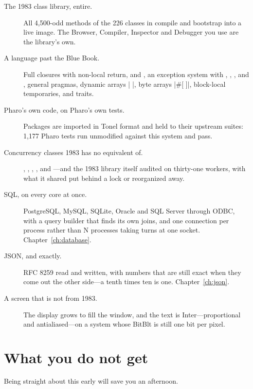 \begin{description}
\item[The 1983 class library, entire.] All 4{,}500-odd methods of the 226
  classes in  compile and bootstrap into a live image. The
  Browser, Compiler, Inspector and Debugger you use are the library's own.
\item[A language past the Blue Book.] Full closures with non-local return,
   and , an exception system with ,
  , ,  and , general pragmas,
  dynamic arrays \ct|{ }|, byte arrays \ct|#[ ]|, block-local temporaries, and
  traits.
\item[Pharo's own code, on Pharo's own tests.] Packages are imported in Tonel
  format and held to their upstream suites: 1{,}177 Pharo tests run unmodified
  against this system and pass.
\item[Concurrency classes 1983 has no equivalent of.] ,
  , , , and
  ---and the 1983 library itself audited on
  thirty-one workers, with what it shared put behind a lock or reorganized
  away.
\item[SQL, on every core at once.] PostgreSQL, MySQL, SQLite, Oracle and SQL
  Server through ODBC, with a query builder that finds its own joins, and one
  connection per process rather than N processes taking turns at one socket.
  Chapter~\ref{ch:database}.
\item[JSON, and exactly.] RFC 8259 read and written, with numbers that are
  still exact when they come out the other side---a tenth times ten is one.
  Chapter~\ref{ch:json}.
\item[A screen that is not from 1983.] The display grows to fill the window,
  and the text is Inter---proportional and antialiased---on a system whose
  BitBlt is still one bit per pixel.
\end{description}

\section{What you do not get}

Being straight about this early will save you an afternoon.


